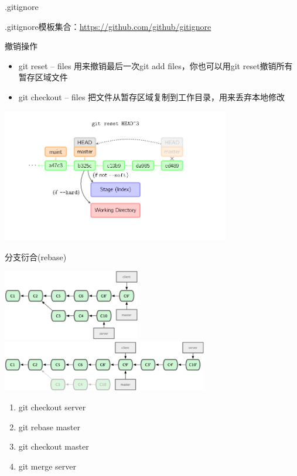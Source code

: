 \documentclass[CJK, 10pt]{beamer}
\begin{document}
\begin{CJK*}{UTF8}{gbsn}
\begin{frame}{.gitignore}
\begin{block}{}
    .gitignore模板集合：\href{https://github.com/github/gitignore}{https://github.com/github/gitignore}
    \end{block}
\end{frame}
\begin{frame}{撤销操作}
    \begin{itemize}
        \item git reset -- files 用来撤销最后一次git add files，你也可以用git reset撤销所有暂存区域文件
        \item git checkout -- files 把文件从暂存区域复制到工作目录，用来丢弃本地修改
    \end{itemize}
    \includegraphics[width=10cm]{reset-commit.png}
\end{frame}
\begin{frame}{分支衍合(rebase)}
    \begin{center}
        \includegraphics[width=6cm]{git-rebase-1.png} \\
        \includegraphics[width=9cm]{git-rebase-2.png}
        \begin{enumerate}
            \item git checkout server
            \item git rebase master
            \item git checkout master
            \item git merge server

\end{enumerate}
\end{center}
\end{frame}
\end{CJK*}
\end{document}
